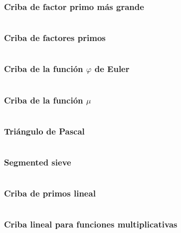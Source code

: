 \documentclass[11pt]{article}
\begin{document}
			\subsubsection{Criba de factor primo más grande}
			\inputminted[tabsize=2,breaklines,firstline=939,lastline=948,fontsize=\small]{c++}{numberTheory.cpp}
			
			\subsubsection{Criba de factores primos}
			\inputminted[tabsize=2,breaklines,firstline=162,lastline=170,fontsize=\small]{c++}{numberTheory.cpp}
			
			\subsubsection{Criba de la función $\varphi$ de Euler}
			\inputminted[tabsize=2,breaklines,firstline=172,lastline=180,fontsize=\small]{c++}{numberTheory.cpp}
			
			\subsubsection{Criba de la función $\mu$}
			\inputminted[tabsize=2,breaklines,firstline=801,lastline=809,fontsize=\small]{c++}{numberTheory.cpp}
			
			\subsubsection{Triángulo de Pascal}
			\inputminted[tabsize=2,breaklines,firstline=182,lastline=192,fontsize=\small]{c++}{numberTheory.cpp}
			
			\subsubsection{Segmented sieve}
			\inputminted[tabsize=2,breaklines,firstline=860,lastline=892,fontsize=\small]{c++}{numberTheory.cpp}
			
			\subsubsection{Criba de primos lineal}
			\inputminted[tabsize=2,breaklines,firstline=811,lastline=825,fontsize=\small]{c++}{numberTheory.cpp}
			
			\subsubsection{Criba lineal para funciones multiplicativas}
			\inputminted[tabsize=2,breaklines,firstline=827,lastline=858,fontsize=\small]{c++}{numberTheory.cpp}
			
\end{document}
